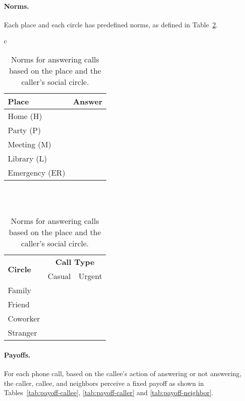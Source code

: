 \documentclass[11pt,          %
               phd,           %
               onehalfspacing %
               ]{ncsuthesis}
\newcommand{\cmark}{\ding{51}\xspace}%
\newcommand{\xmark}{\ding{55}\xspace}%
\newcommand{\fbf}{\textbf}
\newcommand{\nsa}[1]{\textcolor{green!50!black}{NSA:~~#1}}
\begin{document}
\paragraph*{Norms.}
Each place and each circle has predefined norms, as defined in Table~\ref{tab:norms-place}.



\begin{table}[!htb]
\centering
\caption[Norms for answering calls.]{Norms for answering calls based on the place and the caller's social circle.}
\label{tab:norms-place}

\begin{tabular}{c}

\begin{tabular}{lc}
\toprule
\fbf{Place} & \fbf{Answer}\\\midrule
Home (H) & \cmark \\
Party (P) &\cmark\\
Meeting (M) &\xmark\\
Library (L) &\xmark\\
Emergency (ER) &\cmark\\
\bottomrule
\end{tabular}

\\
\vspace{2em}
\\

\begin{tabular}{lcc}
\toprule
\multirow{2}{*}{\fbf{Circle}}&\multicolumn{2}{c}{\fbf{Call Type}}\\\cmidrule{2-3}
&Casual&Urgent\\
\midrule
Family&\cmark&\cmark\\
Friend&\cmark&\cmark\\
Coworker&\cmark&\cmark\\
Stranger&\xmark&\cmark\\
\bottomrule
\end{tabular}


\end{tabular}


\end{table}

\paragraph*{ Payoffs.} For each phone call, based on the callee's action of answering or not answering, the 
caller, callee, and neighbors perceive a fixed payoff
as shown in Tables~\ref{tab:payoff-callee}, \ref{tab:payoff-caller} 
and \ref{tab:payoff-neighbor}. 
\end{document}
